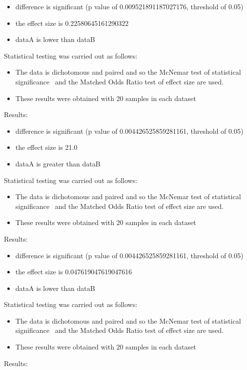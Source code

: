\documentclass[]{article}
\begin{document}
\begin{itemize}
\item{difference is significant (p value of 0.009521891187027176, threshold of 0.05)}
\item{the effect size is 0.22580645161290322}
\item{dataA is lower than dataB}
\end{itemize}Statistical testing was carried out as follows: \begin{itemize}
\item{The data is dichotomous and paired and so the McNemar test of statistical significance~\cite{Gibbons2011} and the Matched Odds Ratio test of effect size are used.}
\item{These results were obtained with 20 samples in each dataset}
\end{itemize}Results:
\begin{itemize}
\item{difference is significant (p value of 0.004426525859281161, threshold of 0.05)}
\item{the effect size is 21.0}
\item{dataA is greater than dataB}
\end{itemize}Statistical testing was carried out as follows: \begin{itemize}
\item{The data is dichotomous and paired and so the McNemar test of statistical significance~\cite{Gibbons2011} and the Matched Odds Ratio test of effect size are used.}
\item{These results were obtained with 20 samples in each dataset}
\end{itemize}Results:
\begin{itemize}
\item{difference is significant (p value of 0.004426525859281161, threshold of 0.05)}
\item{the effect size is 0.047619047619047616}
\item{dataA is lower than dataB}
\end{itemize}Statistical testing was carried out as follows: \begin{itemize}
\item{The data is dichotomous and paired and so the McNemar test of statistical significance~\cite{Gibbons2011} and the Matched Odds Ratio test of effect size are used.}
\item{These results were obtained with 20 samples in each dataset}
\end{itemize}Results:
\end{document}
